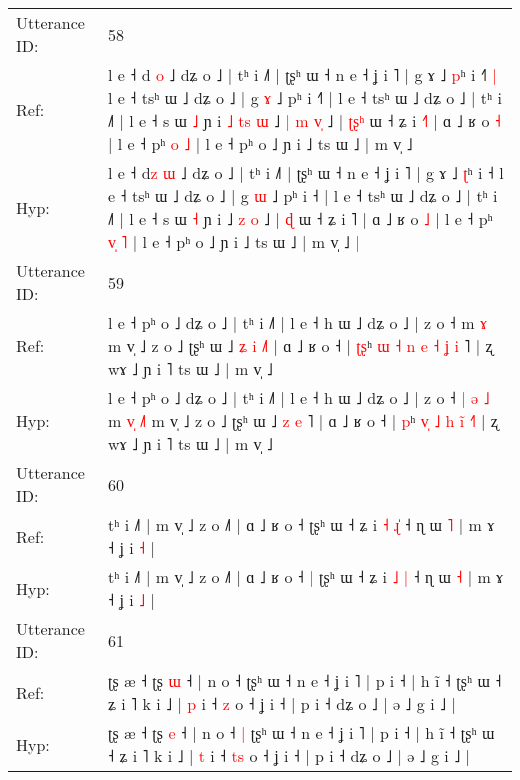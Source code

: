 \documentclass[10pt]{article}
\DeclareRobustCommand{\hl}[1]{{\textcolor{red}{#1}}}
\begin{document}
\begin{longtable}{ll}
 \\
\midrule
Utterance ID: & 58 \\
Ref: & l e ˧ d\hl{} \hl{o} ˩ dʑ o ˩ | tʰ i ˩˥ | ʈʂʰ ɯ ˧ n e ˧ ʝ i ˥ | g ɤ ˩ \hl{p}ʰ i ˧\hl{˥}\hl{ }\hl{|} l e ˧ tsʰ ɯ ˩ dʑ o ˩ | g \hl{ɤ} ˩ pʰ i ˧\hl{˥} | l e ˧ tsʰ ɯ ˩ dʑ o ˩ | tʰ i ˩˥ | l e ˧ s ɯ \hl{˩} ɲ i\hl{ }\hl{˩}\hl{ }\hl{t}\hl{s}\hl{ }\hl{ɯ} ˩\hl{ }\hl{|} \hl{m} \hl{v}\hl{̩} ˩ | \hl{ʈ}\hl{ʂ}\hl{ʰ} ɯ ˧ ʑ i \hl{˧}˥ | ɑ ˩ ʁ o \hl{˧} | l e ˧ pʰ \hl{}\hl{o} \hl{˩} | l e ˧ pʰ o ˩ ɲ i ˩ ts ɯ ˩ | m v̩ ˩\hl{}\hl{}
 \\
Hyp: & l e ˧ d\hl{z} \hl{ɯ} ˩ dʑ o ˩ | tʰ i ˩˥ | ʈʂʰ ɯ ˧ n e ˧ ʝ i ˥ | g ɤ ˩ \hl{ʈ}ʰ i ˧\hl{}\hl{}\hl{} l e ˧ tsʰ ɯ ˩ dʑ o ˩ | g \hl{ɯ} ˩ pʰ i ˧\hl{} | l e ˧ tsʰ ɯ ˩ dʑ o ˩ | tʰ i ˩˥ | l e ˧ s ɯ \hl{˧} ɲ i\hl{}\hl{}\hl{}\hl{}\hl{}\hl{}\hl{} ˩\hl{}\hl{} \hl{z} \hl{}\hl{o} ˩ | \hl{}\hl{}\hl{ɖ} ɯ ˧ ʑ i \hl{}˥ | ɑ ˩ ʁ o \hl{˩} | l e ˧ pʰ \hl{v}\hl{̩} \hl{˥} | l e ˧ pʰ o ˩ ɲ i ˩ ts ɯ ˩ | m v̩ ˩\hl{ }\hl{|}
 \\
\midrule
Utterance ID: & 59 \\
Ref: & l e ˧ pʰ o ˩ dʑ o ˩ | tʰ i ˩˥ | l e ˧ h ɯ ˩ dʑ o ˩ | z o ˧\hl{}\hl{}\hl{}\hl{}\hl{}\hl{} m\hl{}\hl{}\hl{} \hl{}\hl{ɤ} m v̩ ˩ z o ˩ ʈʂʰ ɯ ˩ \hl{ʑ} \hl{i} \hl{˩}˥ | ɑ ˩ ʁ o ˧ | \hl{ʈ}\hl{ʂ}ʰ \hl{ɯ}\hl{ }\hl{˧} \hl{n} \hl{e} \hl{˧}\hl{ }\hl{ʝ} \hl{i}\hl{ }˥ | ʐ wɤ ˩ ɲ i ˥ ts ɯ ˩ | m v̩ ˩
 \\
Hyp: & l e ˧ pʰ o ˩ dʑ o ˩ | tʰ i ˩˥ | l e ˧ h ɯ ˩ dʑ o ˩ | z o ˧\hl{ }\hl{|}\hl{ }\hl{ə}\hl{ }\hl{˩} m\hl{ }\hl{v}\hl{̩} \hl{˩}\hl{˥} m v̩ ˩ z o ˩ ʈʂʰ ɯ ˩ \hl{z} \hl{e} \hl{}˥ | ɑ ˩ ʁ o ˧ | \hl{}\hl{p}ʰ \hl{}\hl{v}\hl{̩} \hl{˩} \hl{h} \hl{}\hl{i}\hl{̃} \hl{}\hl{˧}˥ | ʐ wɤ ˩ ɲ i ˥ ts ɯ ˩ | m v̩ ˩
 \\
\midrule
Utterance ID: & 60 \\
Ref: & tʰ i ˩˥ | m v̩ ˩ z o ˩˥ | ɑ ˩ ʁ o ˧\hl{}\hl{} ʈʂʰ ɯ ˧ ʑ i \hl{˧} \hl{ɻ}\hl{̍} ˧ ɳ ɯ \hl{˥} | m ɤ ˧ ʝ i \hl{˧} |
 \\
Hyp: & tʰ i ˩˥ | m v̩ ˩ z o ˩˥ | ɑ ˩ ʁ o ˧\hl{ }\hl{|} ʈʂʰ ɯ ˧ ʑ i \hl{˩} \hl{}\hl{|} ˧ ɳ ɯ \hl{˧} | m ɤ ˧ ʝ i \hl{˩} |
 \\
\midrule
Utterance ID: & 61 \\
Ref: & ʈʂ æ ˧ ʈʂ \hl{ɯ} ˧ | n o ˧\hl{}\hl{} ʈʂʰ ɯ ˧ n e ˧ ʝ i ˥ | p i ˧ | h ĩ ˧ ʈʂʰ ɯ ˧ ʑ i ˥ k i ˩ | \hl{p} i ˧ \hl{}\hl{z} o ˧ ʝ i ˧ | p i ˧ dʑ o ˩ | ə ˩ g i ˩ |
 \\
Hyp: & ʈʂ æ ˧ ʈʂ \hl{e} ˧ | n o ˧\hl{ }\hl{|} ʈʂʰ ɯ ˧ n e ˧ ʝ i ˥ | p i ˧ | h ĩ ˧ ʈʂʰ ɯ ˧ ʑ i ˥ k i ˩ | \hl{t} i ˧ \hl{t}\hl{s} o ˧ ʝ i ˧ | p i ˧ dʑ o ˩ | ə ˩ g i ˩ |

\end{longtable}
\end{document}
